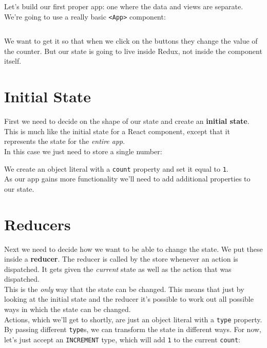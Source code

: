 \hr

Let's build our first proper app: one where the data and views are separate. We're going to use a really basic \texttt{<App>} component:

\inputminted{jsx}{01/figures/02/01-App.jsx}

We want to get it so that when we click on the buttons they change the value of the counter. But our state is going to live inside Redux, not inside the component itself.


\section{Initial State}

First we need to decide on the shape of our state and create an \textbf{initial state}. This is much like the initial state for a React component, except that it represents the state for the \textit{entire app}.
\\

In this case we just need to store a single number:


We create an object literal with a \texttt{count} property and set it equal to \texttt{1}.
\\

As our app gains more functionality we'll need to add additional properties to our state.



\section{Reducers}

Next we need to decide how we want to be able to change the state. We put these inside a \textbf{reducer}. The reducer is called by the store whenever an action is dispatched. It gets given the \textit{current} state as well as the action that was dispatched.
\\

This is the \textit{only} way that the state can be changed. This means that just by looking at the initial state and the reducer it's possible to work out all possible ways in which the state can be changed.
\\

Actions, which we'll get to shortly, are just an object literal with a \texttt{type} property. By passing different \texttt{type}s, we can transform the state in different ways. For now, let's just accept an \texttt{INCREMENT} type, which will add \texttt{1} to the current \texttt{count}:

